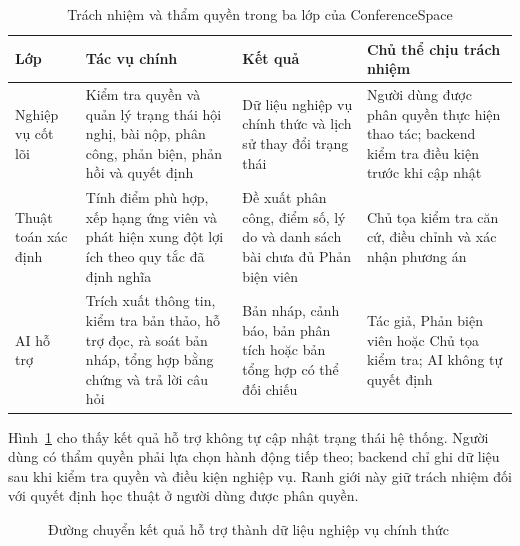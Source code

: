 \begin{table}[H]
\centering
\caption{Trách nhiệm và thẩm quyền trong ba lớp của ConferenceSpace}
\label{tab:ch3-demo-responsibility}
\setlength{\tabcolsep}{2pt}
\renewcommand{\arraystretch}{1.15}
\begin{tabular}{|T{0.17\textwidth}|T{0.25\textwidth}|T{0.24\textwidth}|T{0.23\textwidth}|}
\hline
Lớp & Tác vụ chính & Kết quả & Chủ thể chịu trách nhiệm \\ \hline
Nghiệp vụ cốt lõi & Kiểm tra quyền và quản lý trạng thái hội nghị, bài nộp, phân công, phản biện, phản hồi và quyết định & Dữ liệu nghiệp vụ chính thức và lịch sử thay đổi trạng thái & Người dùng được phân quyền thực hiện thao tác; backend kiểm tra điều kiện trước khi cập nhật \\ \hline
Thuật toán xác định & Tính điểm phù hợp, xếp hạng ứng viên và phát hiện xung đột lợi ích theo quy tắc đã định nghĩa & Đề xuất phân công, điểm số, lý do và danh sách bài chưa đủ Phản biện viên & Chủ tọa kiểm tra căn cứ, điều chỉnh và xác nhận phương án \\ \hline
AI hỗ trợ & Trích xuất thông tin, kiểm tra bản thảo, hỗ trợ đọc, rà soát bản nháp, tổng hợp bằng chứng và trả lời câu hỏi & Bản nháp, cảnh báo, bản phân tích hoặc bản tổng hợp có thể đối chiếu & Tác giả, Phản biện viên hoặc Chủ tọa kiểm tra; AI không tự quyết định \\ \hline
\end{tabular}
\end{table}

Hình~\ref{fig:ch3-demo-responsibility} cho thấy kết quả hỗ trợ không tự cập nhật trạng thái hệ thống. Người dùng có thẩm quyền phải lựa chọn hành động tiếp theo; backend chỉ ghi dữ liệu sau khi kiểm tra quyền và điều kiện nghiệp vụ. Ranh giới này giữ trách nhiệm đối với quyết định học thuật ở người dùng được phân quyền.

\begin{figure}[H]
\centering
\begin{adjustbox}{max width=\textwidth}
\end{adjustbox}
\caption{Đường chuyển kết quả hỗ trợ thành dữ liệu nghiệp vụ chính thức}
\label{fig:ch3-demo-responsibility}
\end{figure}


